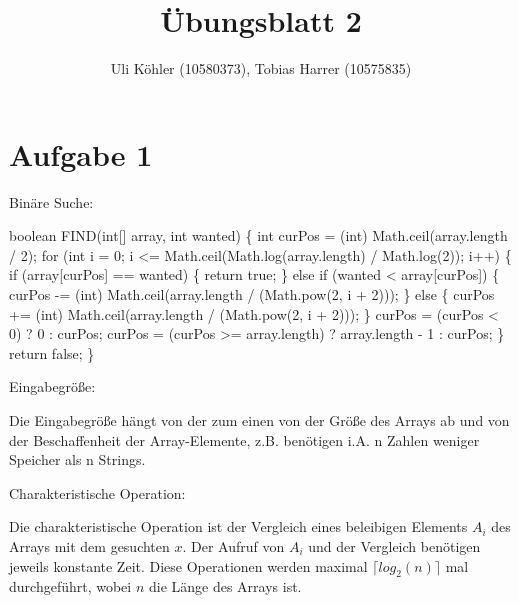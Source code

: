 \documentclass[a4paper,10pt,freqn]{article}
\title{Übungsblatt 2}
\author{Uli Köhler (10580373), Tobias Harrer (10575835)}
\begin{document}
\maketitle

\section{Aufgabe 1}
Binäre Suche:\newline

boolean FIND(int[] array, int wanted) \{\newline
        int curPos = (int) Math.ceil(array.length / 2);\newline
        for (int i = 0; i <= Math.ceil(Math.log(array.length) / Math.log(2)); i++) \{\newline
            if (array[curPos] == wanted) \{\newline
                return true;\newline
            \} else if (wanted < array[curPos]) \{\newline
                curPos -= (int) Math.ceil(array.length / (Math.pow(2, i + 2)));\newline
            \} else \{\newline
                curPos += (int) Math.ceil(array.length / (Math.pow(2, i + 2)));\newline
            \}\newline
            curPos = (curPos < 0) ? 0 : curPos;\newline
            curPos = (curPos >= array.length) ? array.length - 1 : curPos;\newline
        \}\newline
        return false;\newline
    	\}\newline
    	
\begin{bfseries}Eingabegröße:\end{bfseries}\newline
Die Eingabegröße hängt von  der zum einen von der Größe des Arrays ab und von der
Beschaffenheit der Array-Elemente, z.B. benötigen i.A. n Zahlen weniger Speicher
als n Strings.

\begin{bfseries}Charakteristische Operation:\end{bfseries}\newline
Die charakteristische Operation ist der Vergleich eines beleibigen Elements $A_i$ des Arrays mit dem gesuchten $x$.
Der Aufruf von $A_i$ und der Vergleich benötigen jeweils konstante Zeit. Diese Operationen werden maximal
$\lceil log_{2}(n)\rceil$ mal durchgeführt, wobei $n$ die Länge des Arrays ist.
\end{document}
